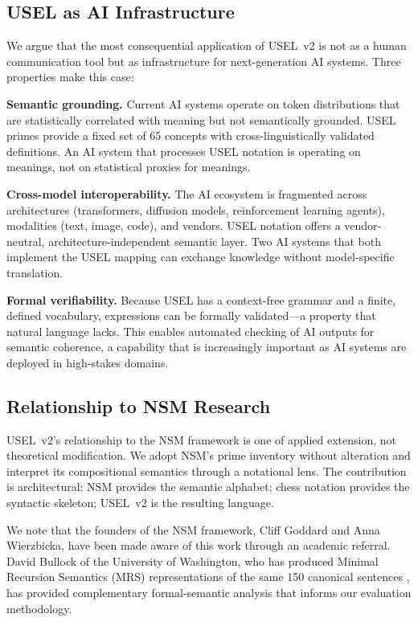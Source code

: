 \documentclass[11pt,a4paper]{article}
\begin{document}
\subsection{USEL as AI Infrastructure}
\label{sec:ai-infrastructure}

We argue that the most consequential application of USEL~v2 is not as a human communication tool but as infrastructure for next-generation AI systems. Three properties make this case:

\textbf{Semantic grounding.} Current AI systems operate on token distributions that are statistically correlated with meaning but not semantically grounded. USEL primes provide a fixed set of 65 concepts with cross-linguistically validated definitions. An AI system that processes USEL notation is operating on meanings, not on statistical proxies for meanings.

\textbf{Cross-model interoperability.} The AI ecosystem is fragmented across architectures (transformers, diffusion models, reinforcement learning agents), modalities (text, image, code), and vendors. USEL notation offers a vendor-neutral, architecture-independent semantic layer. Two AI systems that both implement the USEL mapping can exchange knowledge without model-specific translation.

\textbf{Formal verifiability.} Because USEL has a context-free grammar and a finite, defined vocabulary, expressions can be formally validated---a property that natural language lacks. This enables automated checking of AI outputs for semantic coherence, a capability that is increasingly important as AI systems are deployed in high-stakes domains.

\subsection{Relationship to NSM Research}
\label{sec:nsm-relationship}

USEL~v2's relationship to the NSM framework is one of applied extension, not theoretical modification. We adopt NSM's prime inventory without alteration and interpret its compositional semantics through a notational lens. The contribution is architectural: NSM provides the semantic alphabet; chess notation provides the syntactic skeleton; USEL~v2 is the resulting language.

We note that the founders of the NSM framework, Cliff Goddard and Anna Wierzbicka, have been made aware of this work through an academic referral. David Bullock of the University of Washington, who has produced Minimal Recursion Semantics (MRS) representations of the same 150 canonical sentences \citep{bullock2021mrs}, has provided complementary formal-semantic analysis that informs our evaluation methodology.
\end{document}
